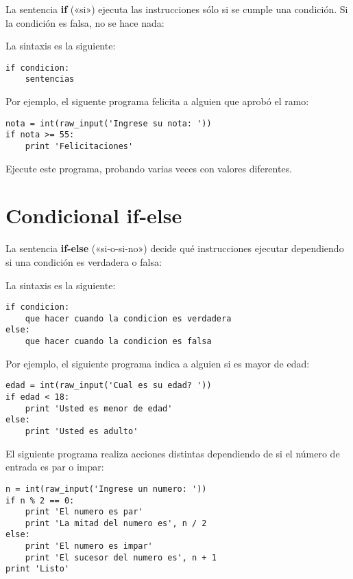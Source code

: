 La sentencia \textbf{if} («si») ejecuta las instrucciones sólo si se
cumple una condición. Si la condición es falsa, no se hace nada:

\begin{center}
  
\end{center}


La sintaxis es la siguiente:

\begin{lstlisting}
if condicion:
    sentencias
\end{lstlisting}

Por ejemplo, el siguente programa felicita a alguien que aprobó el ramo:

\begin{lstlisting}
nota = int(raw_input('Ingrese su nota: '))
if nota >= 55:
    print 'Felicitaciones'
\end{lstlisting}

Ejecute este programa, probando varias veces con valores diferentes.

\section{Condicional if-else}

La sentencia \textbf{if-else} («si-o-si-no») decide qué instrucciones
ejecutar dependiendo si una condición es verdadera o falsa:

\begin{center}
  
\end{center}


La sintaxis es la siguiente:

\begin{lstlisting}
if condicion:
    que hacer cuando la condicion es verdadera
else:
    que hacer cuando la condicion es falsa
\end{lstlisting}

Por ejemplo, el siguiente programa indica a alguien si es mayor de edad:

\begin{lstlisting}
edad = int(raw_input('Cual es su edad? '))
if edad < 18:
    print 'Usted es menor de edad'
else:
    print 'Usted es adulto'
\end{lstlisting}

El siguiente programa realiza acciones distintas dependiendo de si el
número de entrada es par o impar:

\begin{lstlisting}
n = int(raw_input('Ingrese un numero: '))
if n % 2 == 0:
    print 'El numero es par'
    print 'La mitad del numero es', n / 2
else:
    print 'El numero es impar'
    print 'El sucesor del numero es', n + 1
print 'Listo'
\end{lstlisting}

